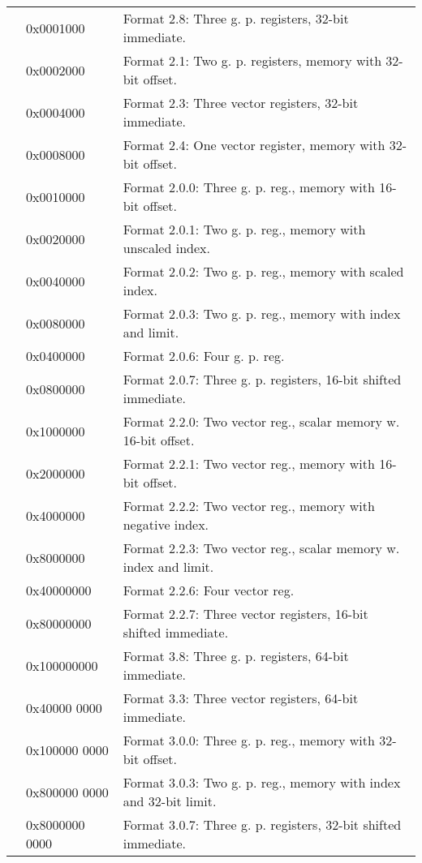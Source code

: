 \documentclass[forwardcom.tex]{subfiles}
\begin{document}
\begin{longtable} {|p{18mm}|p{20mm} p{80mm}|}
  &  0x0001000 & Format 2.8: Three g. p. registers, 32-bit immediate. \\
  &  0x0002000 & Format 2.1: Two g. p. registers, memory with 32-bit offset. \\
  &  0x0004000 & Format 2.3: Three vector registers, 32-bit immediate. \\
  &  0x0008000 & Format 2.4: One vector register, memory with 32-bit offset. \\
  
  &  0x0010000 & Format 2.0.0: Three g. p. reg., memory with 16-bit offset. \\
  &  0x0020000 & Format 2.0.1: Two g. p. reg., memory with unscaled index. \\
  &  0x0040000 & Format 2.0.2: Two g. p. reg., memory with scaled index. \\
  &  0x0080000 & Format 2.0.3: Two g. p. reg., memory with index and limit.\\  
  &  0x0400000 & Format 2.0.6: Four g. p. reg.\\
  &  0x0800000 & Format 2.0.7: Three g. p. registers, 16-bit shifted immediate. \\  

  &  0x1000000 & Format 2.2.0: Two vector reg., scalar memory w. 16-bit offset. \\
  &  0x2000000 & Format 2.2.1: Two vector reg., memory with 16-bit offset. \\
  &  0x4000000 & Format 2.2.2: Two vector reg., memory with negative index. \\
  &  0x8000000 & Format 2.2.3: Two vector reg., scalar memory w. index and limit. \\
  & 0x40000000 & Format 2.2.6: Four vector reg. \\
  & 0x80000000 & Format 2.2.7: Three vector registers, 16-bit shifted immediate.\\
  
  & 0x100000000 & Format 3.8:   Three g. p. registers, 64-bit immediate. \\
  & 0x40000 0000 & Format 3.3:   Three vector registers, 64-bit immediate. \\
 
  &  0x100000 0000 & Format 3.0.0: Three g. p. reg., memory with 32-bit offset. \\
  &  0x800000 0000 & Format 3.0.3: Two g. p. reg., memory with index and 32-bit limit.\\  
  &  0x8000000 0000 & Format 3.0.7: Three g. p. registers, 32-bit shifted immediate. \\  


\end{longtable}
\end{document}
